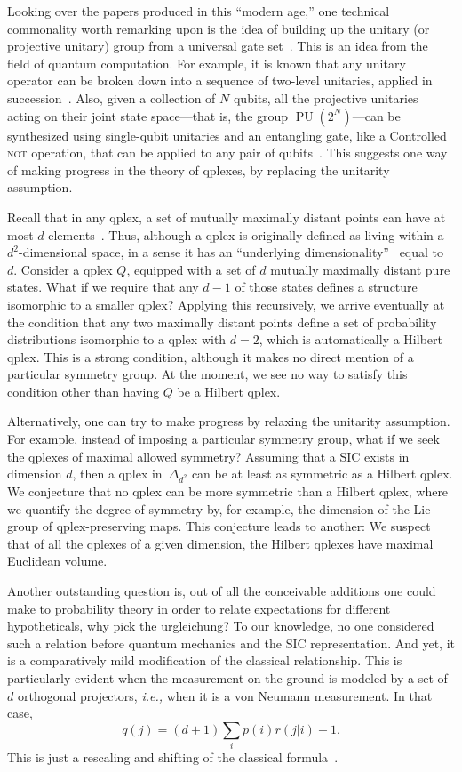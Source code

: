 \documentclass[aps,pra,superscriptaddress,10pt,tightenlines,twocolumn,nofootinbib]{revtex4}
\theoremstyle{remark}
\newcommand{\ps}{\Delta}
\newcommand{\qp}{Q}
\DeclareMathOperator{\PU}{PU}
\begin{document}
Looking over the papers produced in this ``modern age,'' one technical commonality worth remarking upon is the idea of building up the unitary (or projective unitary) group from a universal gate set~\cite{Masanes, HoehnWever}.  This is an idea from the field of quantum computation.  For example, it is known that any unitary operator can be broken down into a sequence of two-level unitaries, applied in succession~\cite[p.\ 188]{MikeAndIke}.  Also, given a collection of $N$ qubits, all the projective unitaries acting on their joint state space---that is, the group $\PU(2^N)$---can be synthesized using single-qubit unitaries and an entangling gate, like a Controlled \textsc{not} operation, that can be applied to any pair of qubits~\cite{Harrow}.  This suggests one way of making progress in the theory of qplexes, by replacing the unitarity assumption.

Recall that in any qplex, a set of mutually maximally distant points can have at most $d$ elements~\cite{appleby2011, transcript}.  Thus, although a qplex is originally defined as living within a $d^2$-dimensional space, in a sense it has an ``underlying dimensionality''~\cite{transcript} equal to~$d$.  Consider a qplex $\qp$, equipped with a set of $d$ mutually maximally distant pure states.  What if we require that any $d-1$ of those states defines a structure isomorphic to a smaller qplex?  Applying this recursively, we arrive eventually at the condition that any two maximally distant points define a set of probability distributions isomorphic to a qplex with $d = 2$, which is automatically a Hilbert qplex.  This is a strong condition, although it makes no direct mention of a particular symmetry group.  At the moment, we see no way to satisfy this condition other than having $\qp$ be a Hilbert qplex.

Alternatively, one can try to make progress by relaxing the unitarity assumption.  For example, instead of imposing a particular symmetry group, what if we seek the qplexes of maximal allowed symmetry?  Assuming that a SIC exists in dimension $d$, then a qplex in~$\ps_{d^2}$ can be at least as symmetric as a Hilbert qplex.  We conjecture that no qplex can be more symmetric than a Hilbert qplex, where we quantify the degree of symmetry by, for example, the dimension of the Lie group of qplex-preserving maps.  This conjecture leads to another:  We suspect that of all the qplexes of a given dimension, the Hilbert qplexes have maximal Euclidean volume.

Another outstanding question is, out of all the conceivable additions
one could make to probability theory in order to relate expectations
for different hypotheticals, why pick the urgleichung?  To our
knowledge, no one considered such a relation before quantum mechanics
and the SIC representation.  And yet, it is a comparatively mild
modification of the classical relationship.  This is particularly
evident when the measurement on the ground is modeled by a set of $d$
orthogonal projectors, \emph{i.e.,} when it is a von Neumann
measurement.  In that case,
\begin{equation}
q(j) = (d+1) \sum_i p(i) r(j|i) - 1.
\end{equation}
This is just a rescaling and shifting of the classical
formula~\cite{transcript}.
\end{document}
